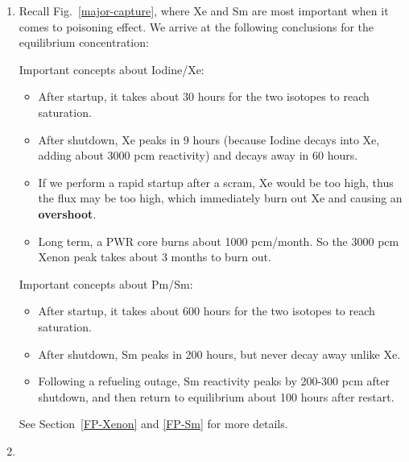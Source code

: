 \documentclass{school-22.211-notes}
\begin{document}
\begin{enumerate}
\item {} Recall Fig.~\ref{major-capture}, where Xe and Sm are most important when it comes to poisoning effect. We arrive at the following conclusions for the equilibrium concentration: 

  Important concepts about Iodine/Xe:
  \begin{itemize}
  \item After startup, it takes about 30 hours for the two isotopes to reach saturation. 
  \item After shutdown, Xe peaks in 9 hours (because Iodine decays into Xe, adding about 3000 pcm reactivity) and decays away in 60 hours. 
  \item If we perform a rapid startup after a scram, Xe would be too high, thus the flux may be too high, which immediately burn out Xe and causing an \textbf{overshoot}. 
  \item Long term, a PWR core burns about 1000 pcm/month. So the 3000 pcm Xenon peak takes about 3 months to burn out. 
  \end{itemize}

  Important concepts about Pm/Sm: 
  \begin{itemize}
  \item After startup, it takes about 600 hours for the two isotopes to reach saturation. 
  \item After shutdown, Sm peaks in 200 hours, but never decay away unlike Xe. 
  \item Following a refueling outage, Sm reactivity peaks by 200-300 pcm after shutdown, and then return to equilibrium about 100 hours after restart. 
  \end{itemize}
  See Section~\ref{FP-Xenon} and \ref{FP-Sm} for more details.

\item {}
\end{enumerate}
\end{document}
